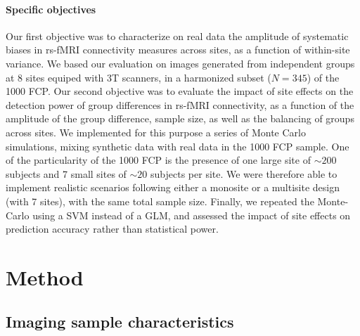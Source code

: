 \documentclass[authoryear]{elsarticle}
\begin{document}
\paragraph{Specific objectives}
Our first objective was to characterize on real data the amplitude of systematic biases in rs-fMRI connectivity measures across sites, as a function of within-site variance. We based our evaluation on images generated from independent groups at 8 sites equiped with 3T scanners, in a harmonized subset ($N=345$) of the 1000 FCP. Our second objective was to evaluate the impact of site effects on the detection power of group differences in rs-fMRI connectivity, as a function of the amplitude of the group difference, sample size, as well as the balancing of groups across sites. We implemented for this purpose a series of Monte Carlo simulations, mixing synthetic data with real data in the 1000 FCP sample. One of the particularity of the 1000 FCP is the presence of one large site of $\sim200$ subjects and 7 small sites of $\sim20$ subjects per site. We were therefore able to implement realistic scenarios following either a monosite or a multisite design (with 7 sites), with the same total sample size. Finally, we repeated the Monte-Carlo using a SVM instead of a GLM, and assessed the impact of site effects on prediction accuracy rather than statistical power.

\section{Method}


\subsection{Imaging sample characteristics}
\end{document}
